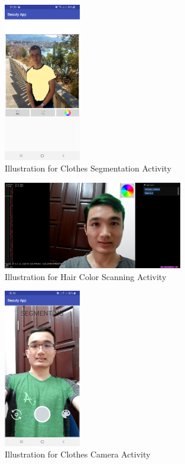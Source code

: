 \begin{figure} [H]
    \centering
    \captionsetup{justification=centering}
    \includegraphics[width=0.3\textwidth]{chapter4/image/segment.jpg}
    \caption{Illustration for Clothes Segmentation Activity}
\end{figure}

\begin{figure} [H]
    \centering
    \captionsetup{justification=centering}
    \includegraphics[width=0.7\textwidth]{chapter4/image/scanning.jpg}
    \caption{Illustration for Hair Color Scanning Activity}
\end{figure}


\begin{figure} [H]
    \centering
    \captionsetup{justification=centering}
    \includegraphics[width=0.3\textwidth]{chapter4/image/camerascreenshot.jpg}
    \caption{Illustration for Clothes Camera Activity}
\end{figure}




